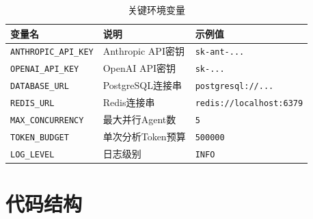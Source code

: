 \documentclass[12pt,a4paper]{ctexrep}
\begin{document}
\begin{table}[H]
\centering
\caption{关键环境变量}
\label{tab:env-vars}
{\small
\begin{tabular}{p{4.5cm} p{4cm} p{4.5cm}}
\toprule
\textbf{变量名} & \textbf{说明} & \textbf{示例值} \\
\midrule
\texttt{ANTHROPIC\_API\_KEY} & Anthropic API密钥 & \texttt{sk-ant-...} \\
\texttt{OPENAI\_API\_KEY} & OpenAI API密钥 & \texttt{sk-...} \\
\texttt{DATABASE\_URL} & PostgreSQL连接串 & \texttt{postgresql://...} \\
\texttt{REDIS\_URL} & Redis连接串 & \texttt{redis://localhost:6379} \\
\texttt{MAX\_CONCURRENCY} & 最大并行Agent数 & \texttt{5} \\
\texttt{TOKEN\_BUDGET} & 单次分析Token预算 & \texttt{500000} \\
\texttt{LOG\_LEVEL} & 日志级别 & \texttt{INFO} \\
\bottomrule
\end{tabular}
}
\end{table}

\chapter{代码结构}
\end{document}

